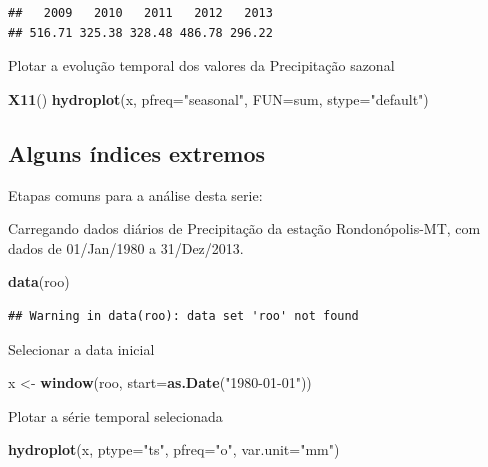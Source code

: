\documentclass[
]{book}
\newenvironment{Shaded}{\begin{snugshade}}{\end{snugshade}}
\newcommand{\DataTypeTok}[1]{\textcolor[rgb]{0.13,0.29,0.53}{#1}}
\newcommand{\KeywordTok}[1]{\textcolor[rgb]{0.13,0.29,0.53}{\textbf{#1}}}
\newcommand{\NormalTok}[1]{#1}
\newcommand{\StringTok}[1]{\textcolor[rgb]{0.31,0.60,0.02}{#1}}
\begin{document}
\begin{verbatim}
##   2009   2010   2011   2012   2013 
## 516.71 325.38 328.48 486.78 296.22
\end{verbatim}

Plotar a evolução temporal dos valores da Precipitação sazonal

\begin{Shaded}
\begin{Highlighting}[]
\KeywordTok{X11}\NormalTok{()}
\KeywordTok{hydroplot}\NormalTok{(x, }\DataTypeTok{pfreq=}\StringTok{"seasonal"}\NormalTok{, }\DataTypeTok{FUN=}\NormalTok{sum, }\DataTypeTok{stype=}\StringTok{"default"}\NormalTok{)}
\end{Highlighting}
\end{Shaded}

\hypertarget{alguns-uxedndices-extremos}{%
\subsection{Alguns índices extremos}\label{alguns-uxedndices-extremos}}

Etapas comuns para a análise desta serie:

Carregando dados diários de Precipitação da estação Rondonópolis-MT, com dados de 01/Jan/1980 a 31/Dez/2013.

\begin{Shaded}
\begin{Highlighting}[]
\KeywordTok{data}\NormalTok{(roo)}
\end{Highlighting}
\end{Shaded}

\begin{verbatim}
## Warning in data(roo): data set 'roo' not found
\end{verbatim}

Selecionar a data inicial

\begin{Shaded}
\begin{Highlighting}[]
\NormalTok{x <-}\StringTok{ }\KeywordTok{window}\NormalTok{(roo, }\DataTypeTok{start=}\KeywordTok{as.Date}\NormalTok{(}\StringTok{"1980-01-01"}\NormalTok{))}
\end{Highlighting}
\end{Shaded}

Plotar a série temporal selecionada

\begin{Shaded}
\begin{Highlighting}[]
\KeywordTok{hydroplot}\NormalTok{(x, }\DataTypeTok{ptype=}\StringTok{"ts"}\NormalTok{, }\DataTypeTok{pfreq=}\StringTok{"o"}\NormalTok{, }\DataTypeTok{var.unit=}\StringTok{"mm"}\NormalTok{)}
\end{Highlighting}
\end{Shaded}
\end{document}
